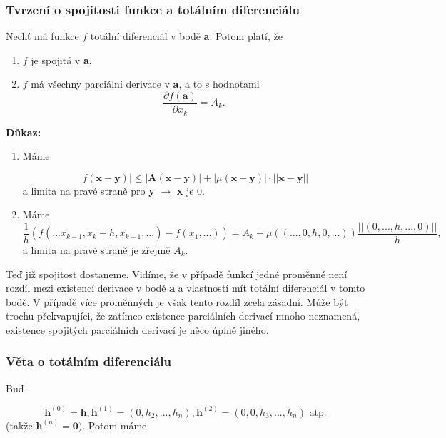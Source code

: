 \documentclass[../main.tex]{subfiles}
\begin{document}
\subsubsection{Tvrzení o spojitosti funkce a totálním diferenciálu}
\hspace{1.2mm}
Nechť má funkce $f$ totální diferenciál v bodě \textbf{a}. Potom platí, že 
\begin{enumerate}
    \item $f$ je spojitá v \textbf{a},
    \item $f$ má všechny parciální derivace v \textbf{a}, a to s hodnotami 
    \[\frac{\partial f(\textbf{a})}{\partial x_k} = A_k.\]
\end{enumerate}
\textbf{Důkaz:}
\begin{enumerate}
    \item Máme
    
    \[|f(\textbf{x}-\textbf{y})| \leq |\textbf{A}(\textbf{x}-\textbf{y})| + |\mu(\textbf{x}-\textbf{y})|\cdot||\textbf{x}-\textbf{y}||\]
    a limita na pravé straně pro \textbf{y} $\rightarrow$ \textbf{x} je 0.
    
    \item Máme 
    \[\frac{1}{h}(f(...x_{k-1},x_k+h,x_{k+1},...) - f(x_1,...)) = A_k + \mu((...,0,h,0,...))\frac{||(0,...,h,...,0)||}{h},\]
    a limita na pravé straně je zřejmě $A_k$.
    
\end{enumerate}


    \noindent
    \hspace{1.2mm}
    Teď již spojitost dostaneme. Vidíme, že v případě funkcí jedné proměnné není rozdíl mezi existencí derivace v bodě \textbf{a} a vlastností
    mít totální diferenciál v tomto bodě. V případě více proměnných je však tento rozdíl zcela zásadní. Může být trochu překvapujíci, že 
    zatímco existence parciálních derivací mnoho neznamená, \underline{existence spojitých parciálních derivací} je něco úplně jiného.

\subsubsection{Věta o totálním diferenciálu}
\hspace{1.2mm}
Buď

\[\textbf{h}^{(0)} = \textbf{h}, \textbf{h}^{(1)} = (0, h_2,...,h_n), \textbf{h}^{(2)} = (0,0,h_3,...,h_n) \textrm{ atp.} \]
(takže $\textbf{h}^{(n)} = \textbf{0})$. Potom máme
\end{document}
